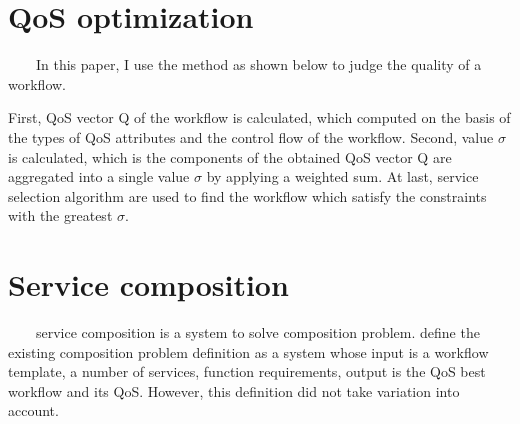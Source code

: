 \documentclass[senior,final,11pt]{iscs-thesis}
\begin{document}
\section{QoS optimization}%
~~~~In this paper, I use the method as shown below to judge the quality of a workflow.

First, QoS vector Q of the workflow is calculated, which computed on the basis of the types of QoS attributes and the control flow of the workflow.
Second, value $\sigma$ is calculated, which is the components of the obtained QoS vector Q are aggregated into a single value $\sigma$ by applying a weighted sum.
At last, service selection algorithm are used to find the workflow which satisfy the constraints with the greatest $\sigma$.

\section{Service composition}
~~~~service composition is a system to solve composition problem. \cite{wagner2012towards} define the existing composition problem definition as a system whose input is a workflow template, a number of services, function requirements, output is the QoS best workflow and its QoS. However, this definition did not take variation into account.
\end{document}

